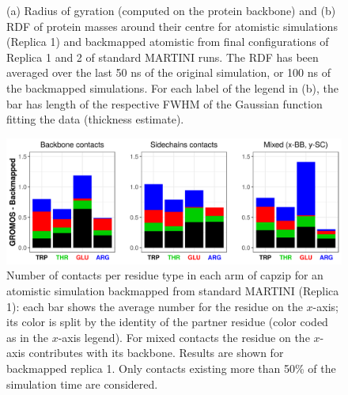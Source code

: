 \begin{figure}
\centering
\vspace{1cm}
\caption[Atomistic backmapped simulations: R$_g$ and RDF]{(a) Radius of gyration (computed on the protein backbone) and (b) RDF of protein masses around their centre for atomistic simulations (Replica 1) and backmapped atomistic from final configurations of Replica 1 and 2 of standard MARTINI runs. The RDF has been averaged over the last 50 ns of the original simulation, or 100 ns of the backmapped simulations. For each label of the legend in (b), the bar has length of the respective FWHM of the Gaussian function fitting the data (thickness estimate). }
\label{fig:backmap}
\vspace{1.5cm}
\centering
\includegraphics[width=0.95\linewidth]{3results_capsule/pics/contacts_BM.png} 
\caption[Atomistic backmapped simulations: contacts]{Number of contacts per residue type in each arm of capzip for an atomistic simulation backmapped from standard MARTINI (Replica 1): each bar shows the average number for the residue on the $x$-axis; its color is split by the identity of the partner residue (color coded as in the $x$-axis legend). For mixed contacts the residue on the $x$-axis contributes with its backbone. Results are shown for backmapped replica 1. Only contacts existing more than 50\% of the simulation time are considered.}
\label{fig:BM_contacts}
\vspace{1cm}
\end{figure}
